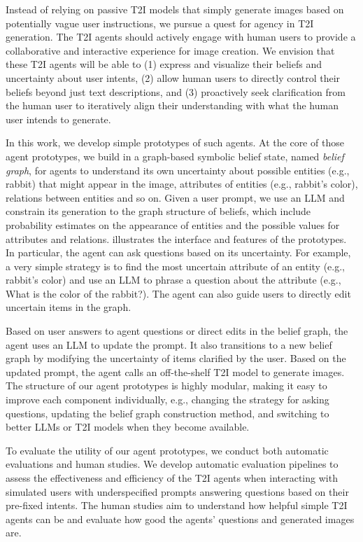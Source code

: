 Instead of relying on passive T2I models that simply generate images based on potentially vague user instructions, we pursue a quest for agency in T2I generation. %
The T2I agents should actively engage with human users to provide a collaborative and interactive experience for image creation. We envision that these T2I agents will be able to (1) express and visualize their beliefs and uncertainty about user intents, (2) allow human users to directly control their beliefs beyond just text descriptions, and (3) proactively seek clarification from the human user to iteratively align their understanding with what the human user intends to generate.

In this work, we develop simple prototypes of such agents. At the core of those agent prototypes, we build in a graph-based symbolic belief state, named \emph{belief graph}, for agents to understand its own uncertainty about possible entities (e.g., rabbit) that might appear in the image, attributes of entities (e.g., rabbit's color), relations between entities and so on. Given a user prompt, we use an LLM and constrain its generation to the graph structure of beliefs, which include probability estimates on the appearance of entities and the possible values for attributes and relations.  illustrates the interface and features of the prototypes. In particular, the agent can ask questions based on its uncertainty. For example, a very simple strategy is to find the most uncertain attribute of an entity (e.g., rabbit's color) and use an LLM to phrase a question about the attribute (e.g., What is the color of the rabbit?). The agent can also guide users to directly edit uncertain items in the graph. 

Based on user answers to agent questions or direct edits in the belief graph, the agent uses an LLM to update the prompt. It also transitions to a new belief graph by modifying the uncertainty of items clarified by the user. Based on the updated prompt, the agent calls an off-the-shelf T2I model to generate images. The structure of our agent prototypes is highly modular, making it easy to improve each component individually, e.g., changing the strategy for asking questions, updating the belief graph construction method, and switching to better LLMs or T2I models when they become available.


To evaluate the utility of our agent prototypes, we conduct both automatic evaluations and human studies.  We develop automatic evaluation pipelines to assess the effectiveness and efficiency of the T2I agents when interacting with simulated users with underspecified prompts answering questions based on their pre-fixed intents. The human studies aim to understand how helpful simple T2I agents can be and evaluate how good the agents' questions and generated images are.

